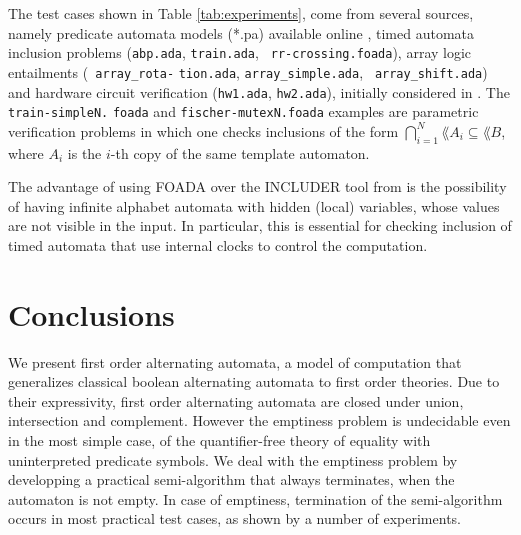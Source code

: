 The test cases shown in Table \ref{tab:experiments}, come from several
sources, namely predicate automata models (*.pa)
\cite{Farzan15,Farzan16} available online \cite{pa}, timed automata
inclusion problems ({\tt abp.ada}, {\tt train.ada}, {\tt
  rr-crossing.foada}), array logic entailments ({\tt
  array\_rota-} {\tt tion.ada}, {\tt array\_simple.ada}, {\tt
  array\_shift.ada}) and hardware circuit verification ({\tt hw1.ada},
{\tt hw2.ada}), initially considered in \cite{IosifRV16}. The {\tt
  train-simpleN.} {\tt foada} and {\tt fischer-mutexN.foada} examples
are parametric verification problems in which one checks inclusions of
the form $\bigcap_{i=1}^N\lang{A_i} \subseteq \lang{B}$, where $A_i$
is the $i$-th copy of the same template automaton.

The advantage of using FOADA over the INCLUDER \cite{includer} tool
from \cite{IosifRV16} is the possibility of having infinite alphabet
automata with hidden (local) variables, whose values are not visible
in the input. In particular, this is essential for checking inclusion
of timed automata that use internal clocks to control the computation.

\section{Conclusions}

We present first order alternating automata, a model of computation
that generalizes classical boolean alternating automata to first order
theories. Due to their expressivity, first order alternating automata
are closed under union, intersection and complement. However the
emptiness problem is undecidable even in the most simple case, of the
quantifier-free theory of equality with uninterpreted predicate
symbols. We deal with the emptiness problem by developping a practical
semi-algorithm that always terminates, when the automaton is not
empty. In case of emptiness, termination of the semi-algorithm occurs
in most practical test cases, as shown by a number of experiments.
